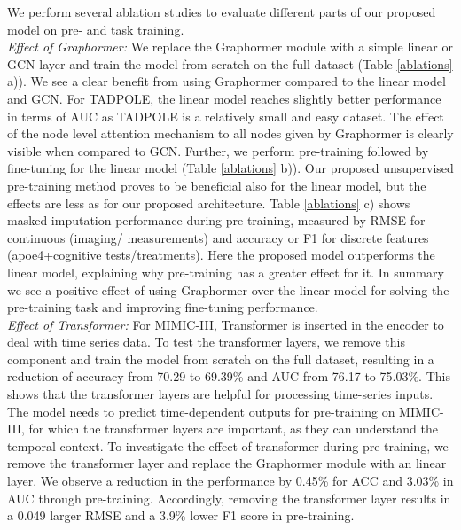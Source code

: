 \documentclass[runningheads]{llncs}
\begin{document}
We perform several ablation studies to evaluate different parts of our proposed model on pre- and task training.\\
\textit{Effect of Graphormer:} We replace the Graphormer module with a simple linear or GCN layer and train the model from scratch on the full dataset (Table \ref{ablations} a)). We see a clear benefit from using Graphormer compared to the linear model and GCN. For TADPOLE, the linear model reaches slightly better performance in terms of AUC as TADPOLE is a relatively small and easy dataset. The effect of the node level attention mechanism to all nodes given by Graphormer is clearly visible when compared to GCN. Further, we perform pre-training followed by fine-tuning for the linear model (Table \ref{ablations} b)). Our proposed unsupervised pre-training method proves to be beneficial also for the linear model, but the effects are less as for our proposed architecture. Table \ref{ablations} c) shows masked imputation performance during pre-training, measured by RMSE for continuous (imaging/ measurements) and accuracy or F1 for discrete features (apoe4+cognitive tests/treatments). Here the proposed model outperforms the linear model, explaining why pre-training has a greater effect for it. In summary we see a positive effect of using Graphormer over the linear model for solving the pre-training task and improving fine-tuning performance.\\
\textit{Effect of Transformer:}
For MIMIC-III, Transformer is inserted in the encoder to deal with time series data. To test the transformer layers, we remove this component and train the model from scratch on the full dataset, resulting in a reduction of accuracy from 70.29 to 69.39\% and AUC from 76.17 to 75.03\%. This shows that the transformer layers are helpful for processing time-series inputs. The model needs to predict time-dependent outputs for pre-training on MIMIC-III, for which the transformer layers are important, as they can understand the temporal context. To investigate the effect of transformer during pre-training, we remove the transformer layer and replace the Graphormer module with an linear layer. We observe a reduction in the performance by 0.45\% for ACC and 3.03\% in AUC through pre-training. Accordingly, removing the transformer layer results in a 0.049 larger RMSE and a 3.9\% lower F1 score in pre-training.
\end{document}

